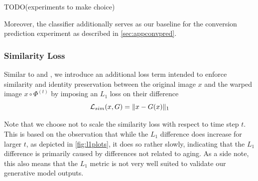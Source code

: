 TODO(experiments to make choice)

Moreover, the classifier additionally serves as our baseline for the conversion prediction experiment as described in \autoref{sec:appconvpred}.

\subsubsection*{Similarity Loss}
Similar to \cite{baumgartner2018visual} and \cite{wegmayr}, we introduce an additional loss term intended to enforce similarity and identity preservation between the original image $x$ and the warped image $ x \circ \Phi^{(t)} $ by imposing an $L_1$ loss on their difference
\begin{equation}
	\mathcal{L}_{sim}( x, G ) = \lVert x - G(x) \rVert_1
\end{equation}

Note that we choose not to scale the similarity loss with respect to time step $t$. This is based on the observation that while the $L_1$ difference does increase for larger $t$, as depicted in \autoref{fig:l1plots}, it does so rather slowly, indicating that the $L_1$ difference is primarily caused by differences not related to aging. As a side note, this also means that the $L_1$ metric is not very well suited to validate our generative model outputs.

